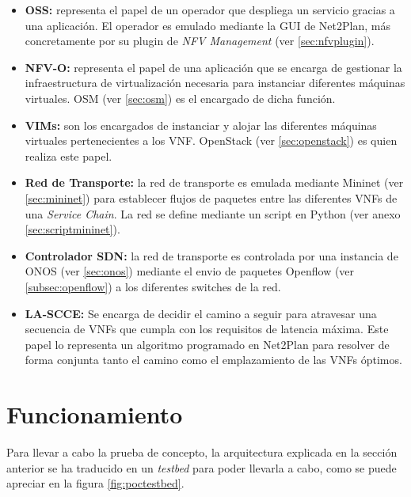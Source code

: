 \begin{itemize}
	\item \textbf{\ac{OSS}:} representa el papel de un operador que despliega un servicio gracias a una aplicación. El operador es emulado mediante la \ac{GUI} de Net2Plan, más concretamente por su plugin de \textit{NFV Management} (ver \ref{sec:nfvplugin}).
	
	\item \textbf{\ac{NFV-O}:} representa el papel de una aplicación que se encarga de gestionar la infraestructura de virtualización necesaria para instanciar diferentes máquinas virtuales. \ac{OSM} (ver \ref{sec:osm}) es el encargado de dicha función.
	
	\item \textbf{\acp{VIM}:} son los encargados de instanciar y alojar las diferentes máquinas virtuales pertenecientes a los VNF. OpenStack (ver \ref{sec:openstack}) es quien realiza este papel.
	
	\item \textbf{Red de Transporte:} la red de transporte es emulada mediante Mininet (ver \ref{sec:mininet}) para establecer flujos de paquetes entre las diferentes \acp{VNF} de una \textit{Service Chain}. La red se define mediante un script en Python (ver anexo \ref{sec:scriptmininet}).
	
	\item \textbf{Controlador \ac{SDN}:} la red de transporte es controlada por una instancia de \ac{ONOS} (ver \ref{sec:onos}) mediante el envio de paquetes Openflow (ver \ref{subsec:openflow}) a los diferentes switches de la red.
	
	\item \textbf{\ac{LA-SCCE}:} Se encarga de decidir el camino a seguir para atravesar una secuencia de \acp{VNF} que cumpla con los requisitos de latencia máxima. Este papel lo representa un algoritmo programado en Net2Plan para resolver de forma conjunta tanto el camino como el emplazamiento de las \acp{VNF} óptimos.
\end{itemize}


\section{Funcionamiento}
\label{sec:funcprueba}

Para llevar a cabo la prueba de concepto, la arquitectura explicada en la sección anterior se ha traducido en un \textit{testbed} para poder llevarla a cabo, como se puede apreciar en la figura \ref{fig:poctestbed}.

